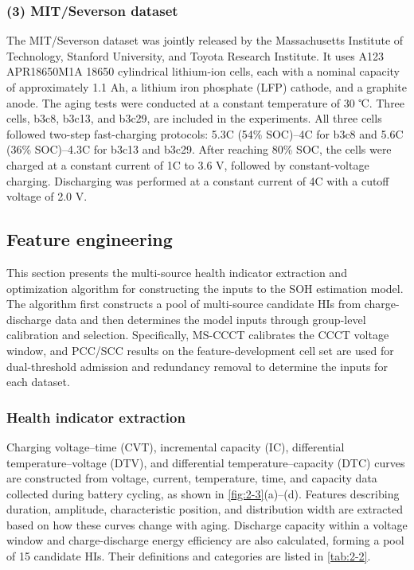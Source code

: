 \subsubsection*{(3) MIT/Severson dataset}

The MIT/Severson dataset was jointly released by the Massachusetts Institute of Technology, Stanford University, and Toyota Research Institute\cite{ref62}. It uses A123 APR18650M1A 18650 cylindrical lithium-ion cells, each with a nominal capacity of approximately 1.1 Ah, a lithium iron phosphate (LFP) cathode, and a graphite anode. The aging tests were conducted at a constant temperature of 30 ℃. Three cells, b3c8, b3c13, and b3c29, are included in the experiments. All three cells followed two-step fast-charging protocols: 5.3C (54\% SOC)–4C for b3c8 and 5.6C (36\% SOC)–4.3C for b3c13 and b3c29. After reaching 80\% SOC, the cells were charged at a constant current of 1C to 3.6 V, followed by constant-voltage charging. Discharging was performed at a constant current of 4C with a cutoff voltage of 2.0 V.



\FloatBarrier

\subsection{Feature engineering}

This section presents the multi-source health indicator extraction and optimization algorithm for constructing the inputs to the SOH estimation model. The algorithm first constructs a pool of multi-source candidate HIs from charge-discharge data and then determines the model inputs through group-level calibration and selection. Specifically, MS-CCCT calibrates the CCCT voltage window, and PCC/SCC results on the feature-development cell set are used for dual-threshold admission and redundancy removal to determine the inputs for each dataset.

\subsubsection{Health indicator extraction}

Charging voltage--time (CVT), incremental capacity (IC), differential temperature--voltage (DTV), and differential temperature--capacity (DTC) curves are constructed from voltage, current, temperature, time, and capacity data collected during battery cycling, as shown in \cref{fig:2-3}(a)--(d). Features describing duration, amplitude, characteristic position, and distribution width are extracted based on how these curves change with aging. Discharge capacity within a voltage window and charge-discharge energy efficiency are also calculated, forming a pool of 15 candidate HIs\cite{ref64,ref63,ref52,ref65}. Their definitions and categories are listed in \cref{tab:2-2}.



